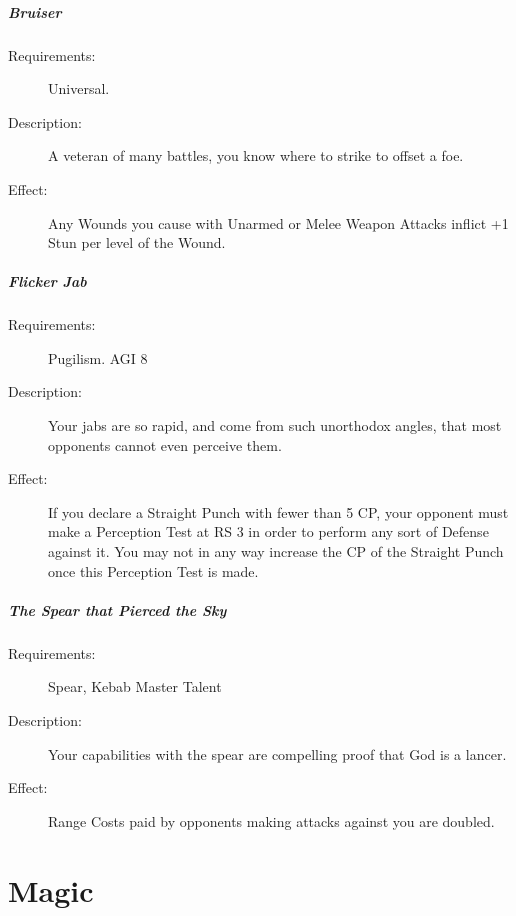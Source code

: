 \documentclass[oneside,11pt,english]{book}
\begin{document}
\paragraph{\label{talent:Bruiser}Bruiser}
\begin{description}
\item [Requirements:] Universal. 
\item [Description:] A veteran of many battles, you know where to strike to offset a foe. 
\item [Effect:] Any Wounds you cause with Unarmed or Melee Weapon Attacks inflict +1 Stun per level of the Wound. 
  
\end{description}
\paragraph{\label{talent:Flicker Jab}Flicker Jab}
\begin{description}
\item [Requirements:] Pugilism. AGI 8 
\item [Description:] Your jabs are so rapid, and come from such unorthodox angles, that most opponents cannot even perceive them. 
\item [Effect:] If you declare a Straight Punch with fewer than 5 CP, your
  opponent must make a Perception Test at RS 3 in order to perform any sort of
  Defense against it. You may not in any way increase the CP of the Straight
  Punch once this Perception Test is made. 
\end{description}
\paragraph{\label{talent:The Spear that Pierced the Sky}The Spear that Pierced the Sky}
\begin{description}
\item [Requirements:] Spear, Kebab Master Talent 
\item [Description:] Your capabilities with the spear are compelling proof that God is a lancer. 
\item [Effect:] Range Costs paid by opponents making attacks against you are doubled. 
\end{description}

\chapter{Magic}
\startcontents[chapters]
\clearpage
\end{document}
